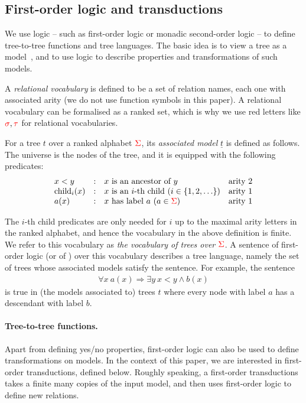   
\subsection{First-order logic and transductions}
We use  logic -- such as first-order logic or monadic second-order logic --  to define tree-to-tree functions and tree languages. The basic idea is to view a tree as a model~\cite[Section 3]{thomas1997languages}, and to use logic to describe properties and transformations of such models.

A \emph{relational vocabulary} is defined to be a set of relation names, each one with associated arity (we do not use function symbols in this paper). A relational vocabulary can be formalised as a ranked set, which is why we use red letters like ${\color{red}{\sigma}}, {\color{red}{\tau}}$ for relational vocabularies. 

\begin{definition}\label{def:tree-model}
   For a tree $t$  over a ranked alphabet ${\color{red}{\Sigma}}$, its \emph{associated model} $\underline t$ is defined as follows. The  universe is the nodes of the tree, and it is equipped with the following predicates:
   $$\begin{array}{lcll}
   x<y & : &   \text{$x$ is an ancestor of $y$} & \text{arity 2}\\
   \mathrm{child}_i(x) & : & \text{$x$ is an $i$-th child ($i\in \{1,2,\ldots\}$)} & \text{arity 1} \\
   a(x) & : &   \text{$x$ has label $a$ ($a \in {\color{red}{\Sigma}}$)} & \text{arity 1}
   \end{array}$$
    \end{definition}

The $i$-th child predicates are only needed for $i$ up to the maximal arity letters in the ranked alphabet, and hence the vocabulary in the above definition is finite. We refer to this vocabulary as \emph{the vocabulary of trees over ${\color{red}{\Sigma}}$}.
 A sentence of first-order logic (or of \mso)  over this vocabulary   describes a tree language, namely the set of trees whose associated models satisfy the sentence.  For example, the sentence 
 \begin{align*}
 \forall x \ a(x) \Rightarrow \exists y \ x < y \land b(x)
 \end{align*} 
 is true in (the models associated to)  trees $t$ where every node with label $a$ has a descendant with label $b$.  
 
 \paragraph*{Tree-to-tree functions.}
 Apart from defining yes/no properties, first-order logic can also be used  to define transformations on  models. In the context of this paper, we are interested in first-order transductions, defined below.  Roughly speaking, a first-order transductions takes a finite many copies of the input model, and then uses first-order logic to define new relations.


